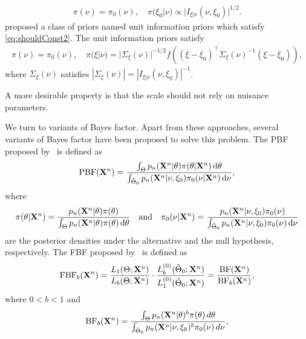 \documentclass[11pt]{article}
\theoremstyle{plain}
\theoremstyle{definition}
\theoremstyle{remark}
\begin{document}
\begin{align}\label{eq:shouldConst2}
    \pi(\nu) = \pi_0 (\nu), \quad \pi(\xi_0 | \nu) \propto |I_{\xi | \nu} (\nu,\xi_0)|^{1/2}.
\end{align}
\cite{Kass1995} proposed a class of priors named unit information priors which satisfy \ref{eq:shouldConst2}.
The unit information priors satisfy
\begin{align*}
    \pi(\nu) = \pi_0 (\nu), \quad \pi(\xi | \nu) = |\Sigma_\xi(\nu)|^{-1/2} f\left((\xi - \xi_0)^\top \Sigma_\xi(\nu)^{-1} ( \xi - \xi_0)\right),
\end{align*}
where $\Sigma_{\xi}(\nu)$ satisfies
$
|\Sigma_{\xi}(\nu)|= |I_{\xi | \nu} (\nu,\xi_0)|^{-1}
$.

A more desirable property is that the scale should not rely on nuisance parameters.



We turn to variants of Bayes factor.
Apart from these approaches, several variants of Bayes factor have been proposed to solve this problem.
The PBF proposed by~\cite{Aitkin1991Posterior}  is defined as
\begin{equation*}
    \text{PBF}(\mathbf{X}^{n})=
    \frac{\int_{\Theta} p_n(\mathbf{X}^{n}|\theta)\pi(\theta|\mathbf{X}^{n})\, \mathrm d\theta}{\int_{\tilde{\Theta}_0}p_n(\mathbf{X}^{n}|\nu,\xi_0)\pi_0(\nu|\mathbf{X}^{n})\, \mathrm d\nu},
\end{equation*}
where 
\begin{align*}
\pi(\theta|\mathbf{X}^{n})
=
\frac{p_n(\mathbf{X}^{n}|\theta) \pi(\theta)}{\int_{\Theta} p_n(\mathbf{X}^{n}|\theta) \pi(\theta)\, \mathrm d \theta}
    \quad \text{and} \quad 
\pi_0(\nu|\mathbf{X}^{n})
=
\frac{p_n(\mathbf{X}^{n}|\nu,\xi_0)\pi_0(\nu)}{
\int_{\tilde{\Theta}_0} p_n(\mathbf{X}^{n}|\nu,\xi_0)\pi_0(\nu)\, \mathrm d\nu
}
\end{align*}
are the posterior densities under the alternative and the null hypothesis, respectively.
The FBF proposed by~\cite{Fractional1995} is defined as
\begin{equation*}
    \text{FBF}_b(\mathbf{X}^{n})=
    \frac{L_{1}(\Theta;\mathbf{X}^{n})}{L_{b}(\Theta;\mathbf{X}^{n})}\cdot \frac{L_{b}^{(0)}(\tilde{\Theta}_0;\mathbf{X}^{n})}{L_{1}^{(0)}(\tilde{\Theta}_0;\mathbf{X}^{n})}
    = \frac{\text{BF}(\mathbf{X}^{n})}{\text{BF}_b (\mathbf{X}^{n})}
    ,
\end{equation*}
where $0<b<1$ and 
\begin{align*}
    \text{BF}_b (\mathbf{X}^{n})=
    \frac{\int_{\Theta} p_n(\mathbf{X}^{n}|\theta)^b \pi(\theta)\, d\theta}{\int_{\tilde{\Theta}_0}p_n(\mathbf{X}^{n}|\nu,\xi_0)^b \pi_0(\nu)\, d\nu},
\end{align*}
\end{document}
